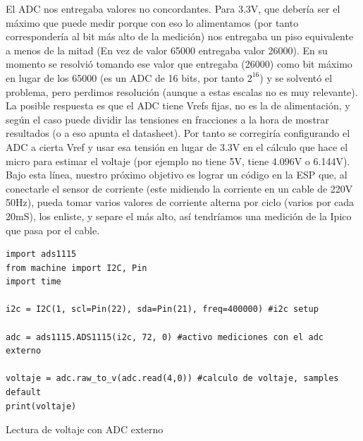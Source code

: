 El ADC nos entregaba valores no concordantes. Para 3.3V, que debería ser el máximo que puede medir porque con eso lo alimentamos (por tanto correspondería al bit más alto de la medición) nos entregaba un piso equivalente a menos de la mitad (En vez de valor 65000 entregaba valor 26000). En su momento se resolvió tomando ese valor que entregaba (26000) como bit máximo en lugar de los 65000 (es un ADC de 16 bits, por tanto $2^16$) y se solventó el problema, pero perdimos resolución (aunque a estas escalas no es muy relevante). La posible respuesta es que el ADC tiene Vrefs fijas, no es la de alimentación, y según el caso puede dividir las tensiones en fracciones a la hora de mostrar resultados (o a eso apunta el datasheet). Por tanto se corregiría configurando el ADC a cierta Vref y usar esa tensión en lugar de 3.3V en el cálculo que hace el micro para estimar el voltaje (por ejemplo no tiene 5V, tiene 4.096V o 6.144V).\\

Bajo esta línea, nuestro próximo objetivo es lograr un código en la ESP que, al conectarle el sensor de corriente (este midiendo la corriente en un cable de 220V 50Hz), pueda tomar varios valores de corriente alterna por ciclo (varios por cada 20mS), los enliste, y separe el más alto, así tendríamos una medición de la Ipico que pasa por el cable. \\

\begin{listing}[H]
\begin{verbatim}
import ads1115
from machine import I2C, Pin
import time

i2c = I2C(1, scl=Pin(22), sda=Pin(21), freq=400000) #i2c setup

adc = ads1115.ADS1115(i2c, 72, 0) #activo mediciones con el adc externo
 
voltaje = adc.raw_to_v(adc.read(4,0)) #calculo de voltaje, samples default
print(voltaje)
\end{verbatim}
\caption{Lectura de voltaje con ADC externo}
\label{lectura ads 1115}
\end{listing}

